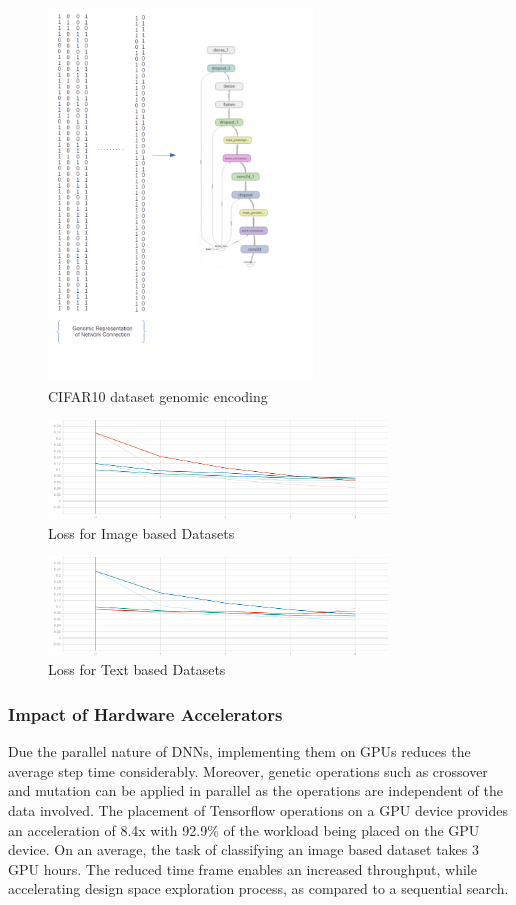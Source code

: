 \documentclass[conference]{IEEEtran}
\begin{document}
\begin{figure}[!b]
\centerline{\includegraphics[width=70mm]{cifar10.png}}
\caption{CIFAR10 dataset genomic encoding}
\label{10}
\end{figure}

\begin{figure}[!t]
\centerline{\includegraphics[width=90mm]{epoch_loss.png}}
\caption{Loss for Image based Datasets}
\label{conv_loss}
\end{figure}

\begin{figure}[!t]
\centerline{\includegraphics[width=90mm]{epoch_loss_2.png}}
\caption{Loss for Text based Datasets}
\label{text_loss}
\end{figure}

\subsubsection{Impact of Hardware Accelerators}

Due the parallel nature of DNNs, implementing them on GPUs reduces the average step time considerably. Moreover, genetic operations such as crossover and mutation can be applied in parallel as the operations are independent of the data involved. The placement of Tensorflow operations on a GPU device provides an acceleration of 8.4x with 92.9\% of the workload being placed on the GPU device. On an average, the task of classifying an image based dataset takes 3 GPU hours. The reduced time frame enables an increased throughput, while accelerating design space exploration process, as compared to a sequential search. 
\end{document}
